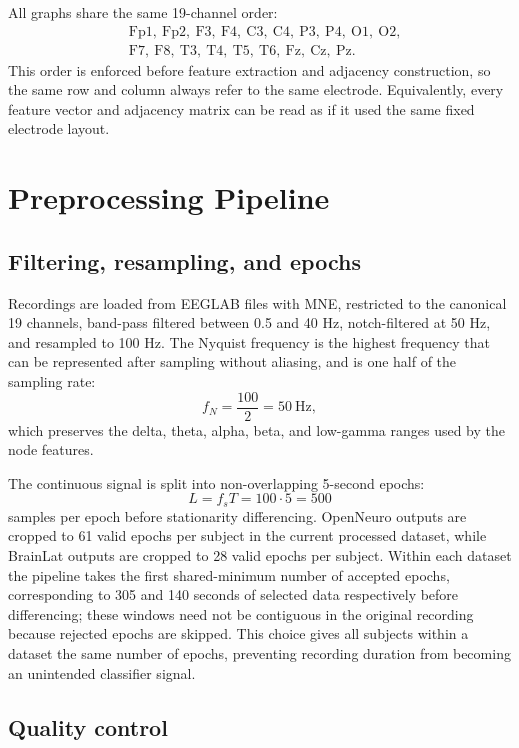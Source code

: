 \documentclass[11pt,a4paper]{article}
\begin{document}
All graphs share the same 19-channel order:
\[
\begin{split}
&\mathrm{Fp1,\ Fp2,\ F3,\ F4,\ C3,\ C4,\ P3,\ P4,\ O1,\ O2,}\\
&\mathrm{F7,\ F8,\ T3,\ T4,\ T5,\ T6,\ Fz,\ Cz,\ Pz}.
\end{split}
\]
This order is enforced before feature extraction and adjacency construction,
so the same row and column always refer to the same electrode.
Equivalently, every feature vector and adjacency matrix can be read as if it
used the same fixed electrode layout.

\section{Preprocessing Pipeline}

\subsection{Filtering, resampling, and epochs}

Recordings are loaded from EEGLAB files with MNE, restricted to the canonical
19 channels, band-pass filtered between 0.5 and 40 Hz, notch-filtered at 50 Hz,
and resampled to 100 Hz. The Nyquist frequency is the highest frequency that
can be represented after sampling without aliasing, and is one half of the
sampling rate:
\[
    f_N=\frac{100}{2}=50\ \mathrm{Hz},
\]
which preserves the delta, theta, alpha, beta, and low-gamma ranges used by
the node features.

The continuous signal is split into non-overlapping 5-second epochs:
\[
    L=f_sT=100\cdot5=500
\]
samples per epoch before stationarity differencing. OpenNeuro outputs are
cropped to 61 valid epochs per subject in the current processed dataset, while
BrainLat outputs are cropped to 28 valid epochs per subject. Within each
dataset the pipeline takes the first shared-minimum number of accepted
epochs, corresponding to 305 and 140 seconds of selected data respectively
before differencing; these windows need not be contiguous in the original
recording because rejected epochs are skipped. This choice gives all subjects
within a dataset the same number of epochs, preventing recording duration from
becoming an unintended classifier signal.

\subsection{Quality control}
\end{document}
